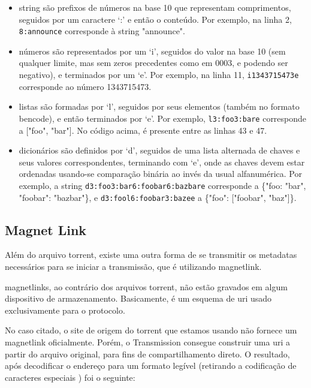 \begin{itemize}
    \item \gls*{string} são prefixos de números na base 10 que representam
        comprimentos, seguidos por um caractere `:' e então o conteúdo. Por exemplo, na
        linha 2, \verb|8:announce| corresponde à \gls*{string} "announce".

    \item números são representados por um `i', seguidos do valor na base 10 (sem
        qualquer limite, mas sem zeros precedentes como em $0003$, e podendo ser
        negativo), e terminados por um `e'. Por exemplo, na linha 11,
        \verb|i1343715473e| corresponde ao número 1343715473.

    \item listas são formadas por `l', seguidos por seus elementos (também no formato
        \gls*{bencode}), e então terminados por `e'. Por exemplo, \verb|l3:foo3:bare|
        corresponde a ["foo", "bar"]. No código acima, é presente entre as linhas 43
        e 47.

    \item dicionários são definidos por `d', seguidos de uma lista alternada de chaves e
        seus valores correspondentes, terminando com `e', onde as chaves devem estar
        ordenadas usando-se comparação binária ao invés da usual alfanumérica.
        Por exemplo, a \gls*{string} \verb|d3:foo3:bar6:foobar6:bazbare| corresponde a
        \{"foo: "bar", "foobar": "bazbar"\}, e \verb|d3:fool6:foobar3:bazee| a
        \{"foo": ["foobar", "baz"]\}.
\end{itemize}

\subsection*{Magnet Link}

Além do arquivo \gls*{torrent}, existe uma outra forma de se transmitir os
\glspl*{metadata} necessários para se iniciar a transmissão, que é utilizando
\gls{magnetlink}.

\Glspl*{magnetlink}, ao contrário dos arquivos \gls*{torrent}, não estão gravados em
algum dispositivo de armazenamento. Basicamente, é um esquema de \gls{uri} usado
exclusivamente para o protocolo.

No caso citado, o site de origem do \gls*{torrent} que estamos usando não fornece um
\gls*{magnetlink} oficialmente. Porém, o Transmission consegue construir uma \gls*{uri}
a partir do arquivo original, para fins de compartilhamento direto. O resultado, após
decodificar o endereço para um formato legível (retirando a codificação de caracteres
especiais \cite{wiki:urlencode}) foi o seguinte:

